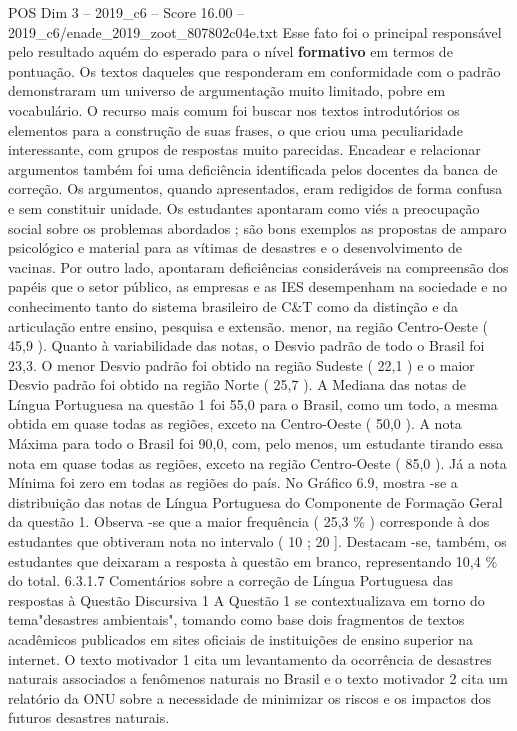 \begin{textsample}{POS Dim 3 – 2019\_c6 – Score 16.00 – 2019\_c6/enade\_2019\_zoot\_807802c04e.txt}
Esse fato foi o principal responsável pelo resultado aquém do esperado para o nível \textbf{formativo} em termos de pontuação.
Os textos daqueles que responderam em conformidade com o padrão demonstraram um universo de argumentação muito limitado, pobre em vocabulário.
O recurso mais comum foi buscar nos textos introdutórios os elementos para a construção de suas frases, o que criou uma peculiaridade interessante, com grupos de respostas muito parecidas.
Encadear e relacionar argumentos também foi uma deficiência identificada pelos docentes da banca de correção.
Os argumentos, quando apresentados, eram redigidos de forma confusa e sem constituir unidade.
Os estudantes apontaram como viés a preocupação social sobre os problemas abordados ; são bons exemplos as propostas de amparo psicológico e material para as vítimas de desastres e o desenvolvimento de vacinas.
Por outro lado, apontaram deficiências consideráveis na compreensão dos papéis que o setor público, as empresas e as IES desempenham na sociedade e no conhecimento tanto do sistema brasileiro de C\&T como da distinção e da articulação entre ensino, pesquisa e extensão. menor, na região Centro-Oeste ( 45,9 ).
Quanto à variabilidade das notas, o Desvio padrão de todo o Brasil foi 23,3.
O menor Desvio padrão foi obtido na região Sudeste ( 22,1 ) e o maior Desvio padrão foi obtido na região Norte ( 25,7 ).
A Mediana das notas de Língua Portuguesa na questão 1 foi 55,0 para o Brasil, como um todo, a mesma obtida em quase todas as regiões, exceto na Centro-Oeste ( 50,0 ).
A nota Máxima para todo o Brasil foi 90,0, com, pelo menos, um estudante tirando essa nota em quase todas as regiões, exceto na região Centro-Oeste ( 85,0 ).
Já a nota Mínima foi zero em todas as regiões do país.
No Gráfico 6.9, mostra -se a distribuição das notas de Língua Portuguesa do Componente de Formação Geral da questão 1.
Observa -se que a maior frequência ( 25,3 \% ) corresponde à dos estudantes que obtiveram nota no intervalo ( 10 ; 20 ].
Destacam -se, também, os estudantes que deixaram a resposta à questão em branco, representando 10,4 \% do total. 6.3.1.7 Comentários sobre a correção de Língua Portuguesa das respostas à Questão Discursiva 1 A Questão 1 se contextualizava em torno do tema"desastres ambientais", tomando como base dois fragmentos de textos acadêmicos publicados em sites oficiais de instituições de ensino superior na internet.
O texto motivador 1 cita um levantamento da ocorrência de desastres naturais associados a fenômenos naturais no Brasil e o texto motivador 2 cita um relatório da ONU sobre a necessidade de minimizar os riscos e os impactos dos futuros desastres naturais.

\end{textsample}
